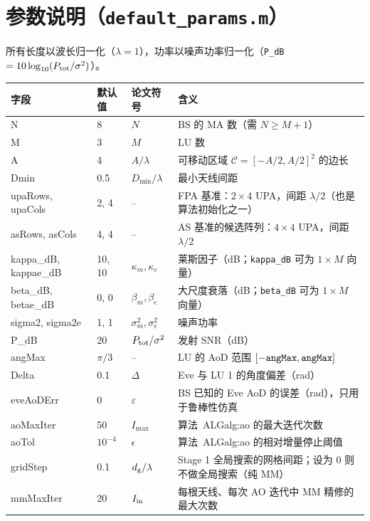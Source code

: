 \documentclass[11pt,a4paper]{ctexart}
\newcommand{\code}[1]{\texttt{#1}}
\newcommand{\Ptot}{P_{\rm tot}}
\begin{document}
\section{参数说明（\code{default\_params.m}）}\label{sec:prm}
所有长度以波长归一化（$\lambda=1$），功率以噪声功率归一化（\code{P\_dB} $=10\log_{10}(\Ptot/\sigma^2)$）。
\begin{longtable}{>{\ttfamily}p{2.5cm}p{1.6cm}p{2.0cm}p{9.3cm}}
\toprule
字段 & 默认值 & 论文符号 & 含义 \\ \midrule
N & 8 & $N$ & BS 的 MA 数（需 $N\ge M+1$）\\
M & 3 & $M$ & LU 数 \\
A & 4 & $A/\lambda$ & 可移动区域 $\mathcal C=[-A/2,A/2]^2$ 的边长 \\
Dmin & 0.5 & $D_{\min}/\lambda$ & 最小天线间距 \\
upaRows, upaCols & 2, 4 & -- & FPA 基准：$2\times4$ UPA，间距 $\lambda/2$（也是算法初始化之一）\\
asRows, asCols & 4, 4 & -- & AS 基准的候选阵列：$4\times4$ UPA，间距 $\lambda/2$ \\
kappa\_dB, kappae\_dB & 10, 10 & $\kappa_m,\kappa_e$ & 莱斯因子（dB；\code{kappa\_dB} 可为 $1\times M$ 向量）\\
beta\_dB, betae\_dB & 0, 0 & $\beta_m,\beta_e$ & 大尺度衰落（dB；\code{beta\_dB} 可为 $1\times M$ 向量）\\
sigma2, sigma2e & 1, 1 & $\sigma_m^2,\sigma_e^2$ & 噪声功率 \\
P\_dB & 20 & $\Ptot/\sigma^2$ & 发射 SNR（dB）\\
angMax & $\pi/3$ & -- & LU 的 AoD 范围 $[-{\tt angMax},{\tt angMax}]$ \\
Delta & 0.1 & $\Delta$ & Eve 与 LU 1 的角度偏差（rad）\\
eveAoDErr & 0 & $\varepsilon$ & BS 已知的 Eve AoD 的误差（rad），只用于鲁棒性仿真 \\ \midrule
aoMaxIter & 50 & $I_{\max}$ & 算法~ALG{alg:ao} 的最大迭代次数 \\
aoTol & $10^{-4}$ & $\epsilon$ & 算法~ALG{alg:ao} 的相对增量停止阈值 \\
gridStep & 0.1 & $d_{\rm g}/\lambda$ & Stage 1 全局搜索的网格间距；设为 0 则不做全局搜索（纯 MM）\\
mmMaxIter & 20 & $I_{\rm in}$ & 每根天线、每次 AO 迭代中 MM 精修的最大次数 \\

\end{longtable}
\end{document}
